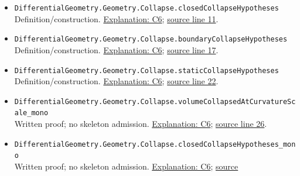 \documentclass[
  letterpaper,
  11pt]{article}
\begin{document}
\begin{itemize}
\item
  {\small\texttt{Differential\allowbreak{}Geometry.\allowbreak{}Geometry.\allowbreak{}Collapse.\allowbreak{}closed\allowbreak{}Collapse\allowbreak{}Hypotheses}}\\
  Definition/construction. \hyperref[collapse-hypotheses]{Explanation:
  C6};
  \href{https://github.com/qinz1yang/differential-geometry-dev/blob/ea0fae60ee01ef8c8d9b57a51794c6538f679c5d/DifferentialGeometry/Geometry/Collapse/GraphManifold.lean\#L11}{source
  line 11}.
\item
  {\small\texttt{Differential\allowbreak{}Geometry.\allowbreak{}Geometry.\allowbreak{}Collapse.\allowbreak{}boundary\allowbreak{}Collapse\allowbreak{}Hypotheses}}\\
  Definition/construction. \hyperref[collapse-hypotheses]{Explanation:
  C6};
  \href{https://github.com/qinz1yang/differential-geometry-dev/blob/ea0fae60ee01ef8c8d9b57a51794c6538f679c5d/DifferentialGeometry/Geometry/Collapse/GraphManifold.lean\#L17}{source
  line 17}.
\item
  {\small\texttt{Differential\allowbreak{}Geometry.\allowbreak{}Geometry.\allowbreak{}Collapse.\allowbreak{}static\allowbreak{}Collapse\allowbreak{}Hypotheses}}\\
  Definition/construction. \hyperref[collapse-hypotheses]{Explanation:
  C6};
  \href{https://github.com/qinz1yang/differential-geometry-dev/blob/ea0fae60ee01ef8c8d9b57a51794c6538f679c5d/DifferentialGeometry/Geometry/Collapse/GraphManifold.lean\#L22}{source
  line 22}.
\item
  {\small\texttt{Differential\allowbreak{}Geometry.\allowbreak{}Geometry.\allowbreak{}Collapse.\allowbreak{}volume\allowbreak{}Collapsed\allowbreak{}At\allowbreak{}Curvature\allowbreak{}Scale\_\allowbreak{}mono}}\\
  Written proof; no skeleton admission.
  \hyperref[collapse-hypotheses]{Explanation: C6};
  \href{https://github.com/qinz1yang/differential-geometry-dev/blob/ea0fae60ee01ef8c8d9b57a51794c6538f679c5d/DifferentialGeometry/Geometry/Collapse/GraphManifold.lean\#L26}{source
  line 26}.
\item
  {\small\texttt{Differential\allowbreak{}Geometry.\allowbreak{}Geometry.\allowbreak{}Collapse.\allowbreak{}closed\allowbreak{}Collapse\allowbreak{}Hypotheses\_\allowbreak{}mono}}\\
  Written proof; no skeleton admission.
  \hyperref[collapse-hypotheses]{Explanation: C6};
  \href{https://github.com/qinz1yang/differential-geometry-dev/blob/ea0fae60ee01ef8c8d9b57a51794c6538f679c5d/DifferentialGeometry/Geometry/Collapse/GraphManifold.lean\#L35}{source
}
\end{itemize}
\end{document}
